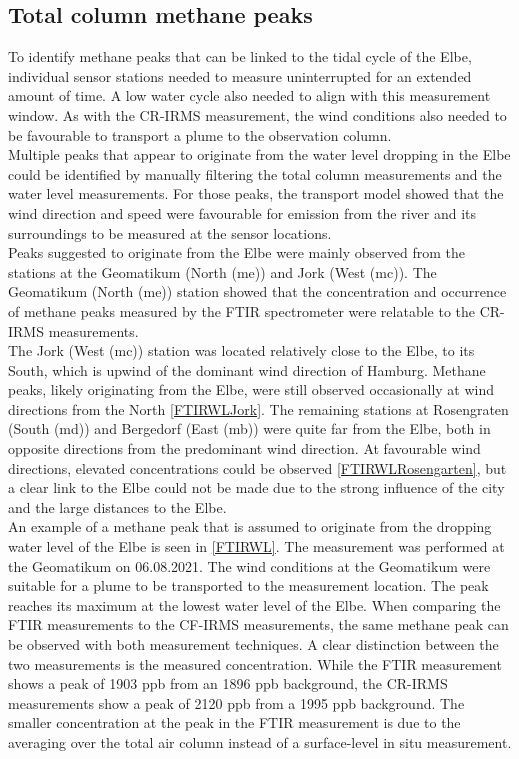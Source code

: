 \subsection{Total column methane peaks}
To identify methane peaks that can be linked to the tidal cycle of the Elbe, individual sensor stations needed to measure uninterrupted for an extended amount of time. A low water cycle also needed to align with this measurement window. As with the CR-IRMS measurement, the wind conditions also needed to be favourable to transport a plume to the observation column.\\
Multiple peaks that appear to originate from the water level dropping in the Elbe could be identified by manually filtering the total column measurements and the water level measurements. For those peaks, the transport model showed that the wind direction and speed were favourable for emission from the river and its surroundings to be measured at the sensor locations. \\
Peaks suggested to originate from the Elbe were mainly observed from the stations at the Geomatikum (North (me)) and Jork (West (mc)). The Geomatikum (North (me)) station showed that the concentration and occurrence of methane peaks measured by the FTIR spectrometer were relatable to the CR-IRMS measurements. \\
The Jork (West (mc)) station was located relatively close to the Elbe, to its South, which is upwind of the dominant wind direction of Hamburg. Methane peaks, likely originating from the Elbe, were still observed occasionally at wind directions from the North \cref{FTIRWLJork}. The remaining stations at Rosengraten (South (md)) and Bergedorf (East (mb)) were quite far from the Elbe, both in opposite directions from the predominant wind direction. At favourable wind directions, elevated concentrations could be observed \cref{FTIRWLRosengarten}, but a clear link to the Elbe could not be made due to the strong influence of the city and the large distances to the Elbe.\\
An example of a methane peak that is assumed to originate from the dropping water level of the Elbe is seen in \cref{FTIRWL}. The measurement was performed at the Geomatikum on 06.08.2021. The wind conditions at the Geomatikum  were suitable for a plume to be transported to the measurement location. The peak reaches its maximum at the lowest water level of the Elbe. When comparing the FTIR measurements to the CF-IRMS measurements, the same methane peak can be observed with both measurement techniques. A clear distinction between the two measurements is the measured concentration. While the FTIR measurement shows a peak of 1903 ppb from an 1896 ppb background, the CR-IRMS measurements show a peak of  2120 ppb from a 1995 ppb background. The smaller concentration at the peak in the FTIR measurement is due to the averaging over the total air column instead of a surface-level in situ measurement.
